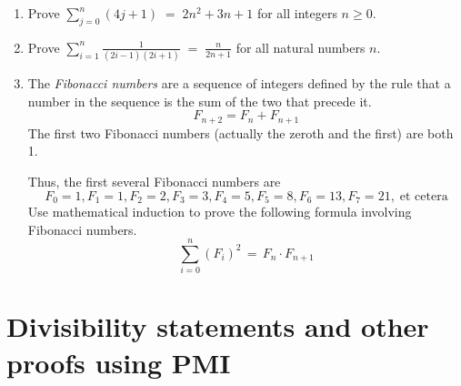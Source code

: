 \documentclass[10pt,]{book}
\theoremstyle{plain}
\theoremstyle{definition}
\theoremstyle{definition}
\numberwithin{equation}{section}
\begin{document}
\begin{enumerate}[label=(\alph*)]
{        }
\item\hypertarget{li-375}{}
          Prove \(\displaystyle \sum_{j=0}^{n}(4j+1) \; = \; 2n^{2}+3n+1\) for all
          integers \(n \geq 0\).
\item\hypertarget{li-376}{}
          Prove \(\displaystyle \sum_{i=1}^{n}\frac{1}{(2i-1)(2i+1)} \; = \; \frac{n}{2n+1}\) for all natural numbers \(n\).
\item\hypertarget{li-377}{}
          The  \emph{Fibonacci numbers} are a sequence of integers defined by
          the rule that a number in the sequence is the sum of the two that 
          precede it.
          \begin{equation*}
            F_{n+2} = F_n + F_{n+1}
          \end{equation*}
          The first two Fibonacci numbers (actually the zeroth and the first) 
          are both 1.  

           Thus, the first several Fibonacci numbers are
          \begin{equation*}
            F_0 = 1, F_1=1, F_2=2, F_3=3, F_4=5, F_5=8, F_6=13, F_7=21, \; \mbox{et cetera}
          \end{equation*}
          Use mathematical induction to prove the following formula involving
          Fibonacci numbers.
          \begin{equation*}
            \sum_{i=0}^n (F_i)^2 \, = \, F_n \cdot F_{n+1}
          \end{equation*}
\end{enumerate}
\typeout{************************************************}
\typeout{************************************************}
\section[{Divisibility statements and other proofs using PMI}]{Divisibility statements and other proofs using PMI}\label{section-28}
\end{document}
